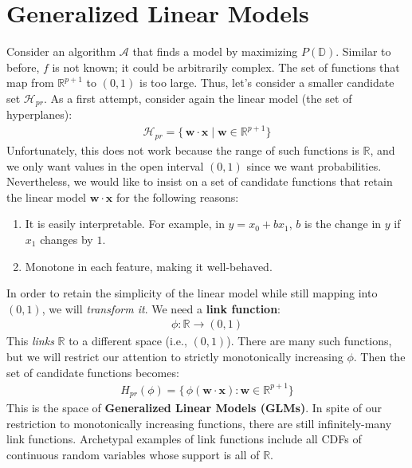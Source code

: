 \documentclass[12pt, a4paper]{article}
\theoremstyle{definition}
\begin{document}
	\section*{Generalized Linear Models}
	Consider an algorithm $\mathcal{A}$ that finds a model by maximizing $P(\mathbb{D})$.
	Similar to before, $f$ is not known; it could be arbitrarily complex. The set of functions
	that map from $\mathbb{R}^{p+1}$ to $(0,1)$ is too large. Thus, let's consider a smaller
	candidate set $\mathcal{H}_{pr}$. As a first attempt, consider again the linear model
	(the set of hyperplanes):
	\begin{align*}
		\mathcal{H}_{pr} = \{\, \bm{w}\cdot \bm{x} \mid \bm{w}\in\mathbb{R}^{p+1}\}
	\end{align*}
	Unfortunately, this does not work because the range of such functions is $\mathbb{R}$,
	and we only want values in the open interval $(0,1)$ since we want probabilities.
	Nevertheless, we would like to insist on a set of candidate functions that retain
	the linear model $\bm{w}\cdot\bm{x}$ for the following reasons:
	\begin{enumerate}[label=(\arabic*)]
		\item It is easily interpretable. For example, in $y = x_0 + bx_1$,
		$b$ is the change in $y$ if $x_1$ changes by $1$.
		\item Monotone in each feature, making it well-behaved.
	\end{enumerate}
	In order to retain the simplicity of the linear model while still mapping into $(0,1)$,
	we will \textit{transform it}. We need a \textbf{link function}:
	\begin{align*}
		\phi:\mathbb{R}\to (0, 1)
	\end{align*}
	This \textit{links} $\mathbb{R}$ to a different space (i.e., $(0,1)$). There are
	many such functions, but we will restrict our attention to strictly monotonically
	increasing $\phi$. Then the set of candidate functions becomes:
	\begin{align*}
		H_{pr}(\phi) = \{\, \phi(\bm{w}\cdot\bm{x}): \bm{w}\in\mathbb{R}^{p+1}\}
	\end{align*}
	This is the space of \textbf{Generalized Linear Models (GLMs)}. In spite of our
	restriction to monotonically increasing functions, there are still infinitely-many
	link functions. Archetypal examples of link functions include all CDFs of continuous
	random variables whose support is all of $\mathbb{R}$.
\end{document}

